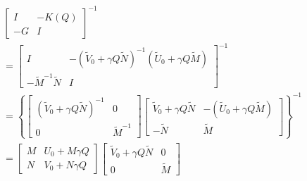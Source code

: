 \documentclass[trsc,nonblindrev]{informs3} %
\begin{document}
\begin{equation}
    \begin{aligned}
         & \left[\begin{array}{cc}
                I  & -K(Q) \\
                -G & I
            \end{array}\right]^{-1}                                                                                                                                                  \\
         & =\left[\begin{array}{cc}
                I                         & -(\tilde{V}_{0}+\gamma Q \tilde{N})^{-1} (\tilde{U}_{0}+\gamma Q \tilde{M}) \\
                -\tilde{M}^{-1} \tilde{N} & I
            \end{array}\right]^{-1}                                                                                                                                                 \\
         & =\left\{\left[\begin{array}{cc}
                (\tilde{V}_{0}+\gamma Q \tilde{N})^{-1} & 0              \\
                0                                       & \tilde{M}^{-1}
            \end{array}\right]\left[\begin{array}{cc}
                \tilde{V}_{0}+\gamma Q \tilde{N} & -(\tilde{U}_{0}+\gamma Q \tilde{M}) \\
                -\tilde{N}                       & \tilde{M}
            \end{array}\right]\right\}^{-1}                                                                                           \\
         & =\left[\begin{array}{cc}
                M & U_{0}+M \gamma Q \\
                N & V_{0}+N \gamma Q
            \end{array}\right]\left[\begin{array}{cc}
                \tilde{V}_{0}+\gamma Q \tilde{N} & 0         \\
                0                                & \tilde{M}
            \end{array}\right]                                                                                                               \\

\end{aligned}
\end{equation}
\end{document}
